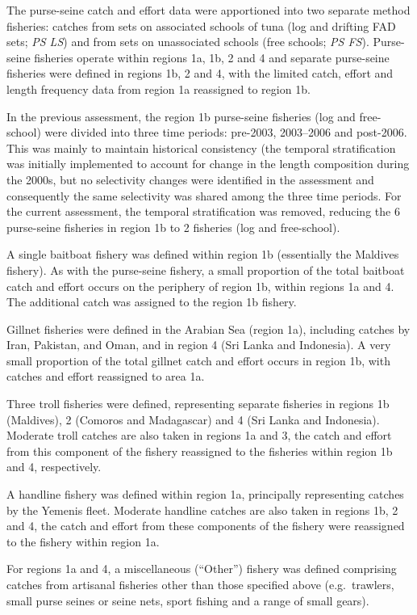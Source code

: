 \documentclass[
]{scrartcl}
\begin{document}
The purse-seine catch and effort data were apportioned into two separate
method fisheries: catches from sets on associated schools of tuna (log
and drifting FAD sets; \emph{PS LS}) and from sets on unassociated
schools (free schools; \emph{PS FS}). Purse-seine fisheries operate
within regions 1a, 1b, 2 and 4 and separate purse-seine fisheries were
defined in regions 1b, 2 and 4, with the limited catch, effort and
length frequency data from region 1a reassigned to region 1b.

In the previous assessment, the region 1b purse-seine fisheries (log and
free-school) were divided into three time periods: pre-2003, 2003--2006
and post-2006. This was mainly to maintain historical consistency (the
temporal stratification was initially implemented to account for change
in the length composition during the 2000s, but no selectivity changes
were identified in the assessment and consequently the same selectivity
was shared among the three time periods. For the current assessment, the
temporal stratification was removed, reducing the 6 purse-seine
fisheries in region 1b to 2 fisheries (log and free-school).

A single baitboat fishery was defined within region 1b (essentially the
Maldives fishery). As with the purse-seine fishery, a small proportion
of the total baitboat catch and effort occurs on the periphery of region
1b, within regions 1a and 4. The additional catch was assigned to the
region 1b fishery.

Gillnet fisheries were defined in the Arabian Sea (region 1a), including
catches by Iran, Pakistan, and Oman, and in region 4 (Sri Lanka and
Indonesia). A very small proportion of the total gillnet catch and
effort occurs in region 1b, with catches and effort reassigned to area
1a.

Three troll fisheries were defined, representing separate fisheries in
regions 1b (Maldives), 2 (Comoros and Madagascar) and 4 (Sri Lanka and
Indonesia). Moderate troll catches are also taken in regions 1a and 3,
the catch and effort from this component of the fishery reassigned to
the fisheries within region 1b and 4, respectively.

A handline fishery was defined within region 1a, principally
representing catches by the Yemenis fleet. Moderate handline catches are
also taken in regions 1b, 2 and 4, the catch and effort from these
components of the fishery were reassigned to the fishery within region
1a.

For regions 1a and 4, a miscellaneous (``Other'') fishery was defined
comprising catches from artisanal fisheries other than those specified
above (e.g.~trawlers, small purse seines or seine nets, sport fishing
and a range of small gears).
\end{document}
